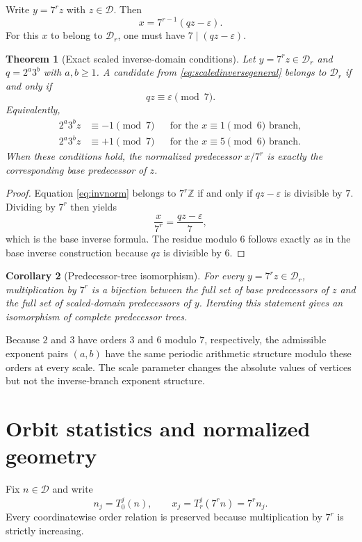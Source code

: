 \documentclass[11pt]{article}
\newtheorem{theorem}{Theorem}[section]
\newtheorem{corollary}[theorem]{Corollary}
\newcommand{\eps}{\varepsilon}
\begin{document}
Write $y=7^rz$ with $z\in\mathcal D$. Then
\begin{equation}
x=7^{r-1}(qz-\eps).
\label{eq:invnorm}
\end{equation}
For this $x$ to belong to $\mathcal D_r$, one must have $7\mid(qz-\eps)$.

\begin{theorem}[Exact scaled inverse-domain conditions]
Let $y=7^rz\in\mathcal D_r$ and $q=2^a3^b$ with $a,b\ge1$. A candidate from \eqref{eq:scaledinversegeneral} belongs to $\mathcal D_r$ if and only if
\begin{equation}
qz\equiv\eps\pmod7.
\label{eq:scaledinvcong}
\end{equation}
Equivalently,
\begin{align}
2^a3^bz&\equiv-1\pmod7 &&\text{for the }x\equiv1\pmod6\text{ branch},
\label{eq:scaledinvcongminus}\\
2^a3^bz&\equiv+1\pmod7 &&\text{for the }x\equiv5\pmod6\text{ branch}.
\label{eq:scaledinvcongplus}
\end{align}
When these conditions hold, the normalized predecessor $x/7^r$ is exactly the corresponding base predecessor of $z$.
\end{theorem}
\begin{proof}
Equation \eqref{eq:invnorm} belongs to $7^r\mathbb Z$ if and only if $qz-\eps$ is divisible by $7$. Dividing by $7^r$ then yields
\[
\frac{x}{7^r}=\frac{qz-\eps}{7},
\]
which is the base inverse formula. The residue modulo $6$ follows exactly as in the base inverse construction because $qz$ is divisible by $6$.
\end{proof}

\begin{corollary}[Predecessor-tree isomorphism]
For every $y=7^rz\in\mathcal D_r$, multiplication by $7^r$ is a bijection between the full set of base predecessors of $z$ and the full set of scaled-domain predecessors of $y$. Iterating this statement gives an isomorphism of complete predecessor trees.
\end{corollary}

Because $2$ and $3$ have orders $3$ and $6$ modulo $7$, respectively, the admissible exponent pairs $(a,b)$ have the same periodic arithmetic structure modulo these orders at every scale. The scale parameter changes the absolute values of vertices but not the inverse-branch exponent structure.

\section{Orbit statistics and normalized geometry}
Fix $n\in\mathcal D$ and write
\[
n_j=T_0^j(n),\qquad x_j=T_r^j(7^rn)=7^rn_j.
\]
Every coordinatewise order relation is preserved because multiplication by $7^r$ is strictly increasing.
\end{document}
